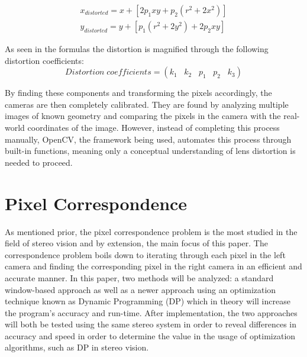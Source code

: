 \documentclass[11pt]{scrartcl}
\begin{document}
\begin{theorem}
    \begin{align}
        x_{distorted} = x + [ 2p_1xy + p_2(r^2+2x^2)]  
       \\ y_{distorted} = y + [ p_1(r^2+ 2y^2)+ 2p_2xy]
    \end{align}
    
\end{theorem}

As seen in the formulas the distortion is magnified through the following distortion coefficients: 
\begin{displaymath}
    Distortion \; coefficients=(k_1 \hspace{10pt} k_2 \hspace{10pt} p_1 \hspace{10pt} p_2 \hspace{10pt} k_3)
\end{displaymath}

By finding these components and transforming the pixels accordingly, the cameras are then completely calibrated. They are found by analyzing multiple images of known geometry and comparing the pixels in the camera with the real-world coordinates of the image. However, 
instead of completing this process manually, OpenCV, the framework being used, automates this process through built-in functions, meaning only a conceptual understanding of lens distortion is needed to proceed. 

\section{Pixel Correspondence}

As mentioned prior, the pixel correspondence problem is the most studied in the field of stereo vision and by extension, the main focus of this paper. The correspondence problem boils down to iterating through each pixel in the left camera and finding the corresponding pixel in the right camera in an efficient and accurate manner. In this paper, 
two methods will be analyzed: a standard window-based approach as well as a newer approach using an optimization technique known as Dynamic Programming (DP) which in theory will increase the program's accuracy and run-time. After implementation, the two approaches will both be tested using the same stereo system in order to reveal differences in accuracy and speed in order to determine the value in the usage of optimization algorithms, such as DP in stereo vision. 
\end{document}
